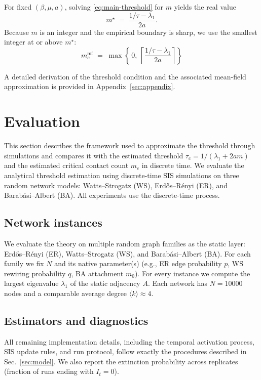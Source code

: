 \documentclass[pdflatex,sn-mathphys-num]{sn-jnl}%
\theoremstyle{thmstyleone}%
\theoremstyle{thmstyletwo}%
\theoremstyle{thmstylethree}%
\begin{document}
For fixed $(\beta,\mu,a)$, solving \eqref{eq:main-threshold} for $m$ yields the real value
\[
m^\star \;=\; \frac{1/\tau - \lambda_1}{2a}.
\]
Because $m$ is an integer and the empirical boundary is sharp, we use the smallest integer at or above $m^\star$:
\begin{equation}
\boxed{\; m_c^{\text{mf}} \;=\; \max\!\left\{\,0,\ \left\lceil \frac{1/\tau - \lambda_1}{2a} \right\rceil \right\} \;}
\label{eq:mc}
\end{equation}

A detailed derivation of the threshold condition and the associated mean-field approximation is provided in Appendix~\ref{sec:appendix}.


\section{Evaluation}\label{sec:simulations}

This section describes the framework used to approximate the threshold through simulations and compares it with the estimated threshold
\(
\tau_c = 1/(\lambda_1+2am)
\)
and the estimated critical contact count \(m_c\) in discrete time. We evaluate the analytical threshold estimation using discrete-time SIS simulations on three random network models: Watts--Strogatz (WS), Erd\H{o}s--R\'enyi (ER), and Barab\'asi--Albert (BA). All experiments use the discrete-time process.

\subsection{Network instances}
We evaluate the theory on multiple random graph families as the static layer:
Erd\H{o}s--R\'enyi (ER), Watts--Strogatz (WS), and Barab\'asi--Albert (BA).
For each family we fix \(N\) and its native parameter(s) (e.g., ER edge probability \(p\), WS rewiring probability \(q\), BA attachment \(m_0\)).
For every instance we compute the largest eigenvalue \(\lambda_1\) of the static adjacency \(A\). Each network has $N=10000$ nodes and a comparable average degree $\langle k \rangle \approx 4$.

\subsection{Estimators and diagnostics}
All remaining implementation details, including the temporal activation process, SIS update rules, and run protocol, follow exactly the procedures described in Sec.~\ref{sec:model}. We also report the extinction probability across replicates (fraction of runs ending with \(I_t=0\)).
\end{document}
